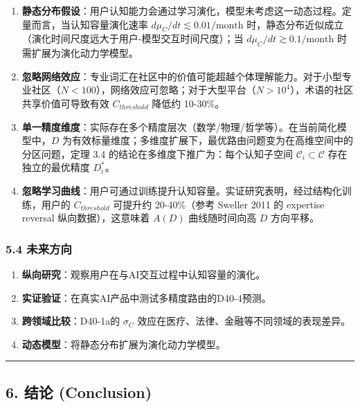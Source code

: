 \documentclass[UTF8, fontset=fandol]{ctexart}
\providecommand{\tightlist}{%
  \setlength{\itemsep}{0pt}\setlength{\parskip}{0pt}}
\begin{document}
\begin{enumerate}
\def\labelenumi{\arabic{enumi}.}
\tightlist
\item
  \textbf{静态分布假设}：用户认知能力会通过学习演化，模型未考虑这一动态过程。定量而言，当认知容量演化速率
  \(d\mu_C/dt \lesssim 0.01/\text{month}\)
  时，静态分布近似成立（演化时间尺度远大于用户-模型交互时间尺度）；当
  \(d\mu_C/dt \gtrsim 0.1/\text{month}\) 时需扩展为演化动力学模型。
\item
  \textbf{忽略网络效应}：专业词汇在社区中的价值可能超越个体理解能力。对于小型专业社区（\(N < 100\)），网络效应可忽略；对于大型平台（\(N > 10^4\)），术语的社区共享价值可导致有效
  \(C_{threshold}\) 降低约 10-30\%。
\item
  \textbf{单一精度维度}：实际存在多个精度层次（数学/物理/哲学等）。在当前简化模型中，\(D\)
  为有效标量维度；多维度扩展下，最优路由问题变为在高维空间中的分区问题，定理
  3.4 的结论在多维度下推广为：每个认知子空间
  \(\mathcal{C}_i \subset \mathcal{C}\) 存在独立的最优精度 \(D_i^*\)。
\item
  \textbf{忽略学习曲线}：用户可通过训练提升认知容量。实证研究表明，经过结构化训练，用户的
  \(C_{threshold}\) 可提升约 20-40\%（参考 Sweller 2011 的 expertise
  reversal 纵向数据），这意味着 \(A(D)\) 曲线随时间向高 \(D\) 方向平移。
\end{enumerate}

\subsubsection{5.4 未来方向}\label{ux672aux6765ux65b9ux5411}

\begin{enumerate}
\def\labelenumi{\arabic{enumi}.}
\tightlist
\item
  \textbf{纵向研究}：观察用户在与AI交互过程中认知容量的演化。
\item
  \textbf{实证验证}：在真实AI产品中测试多精度路由的D40-4预测。
\item
  \textbf{跨领域比较}：D40-1a的 \(\sigma_C\)
  效应在医疗、法律、金融等不同领域的表现差异。
\item
  \textbf{动态模型}：将静态分布扩展为演化动力学模型。
\end{enumerate}

\begin{center}\rule{0.5\linewidth}{0.5pt}\end{center}

\subsection{6. 结论 (Conclusion)}\label{ux7ed3ux8bba-conclusion}
\end{document}
